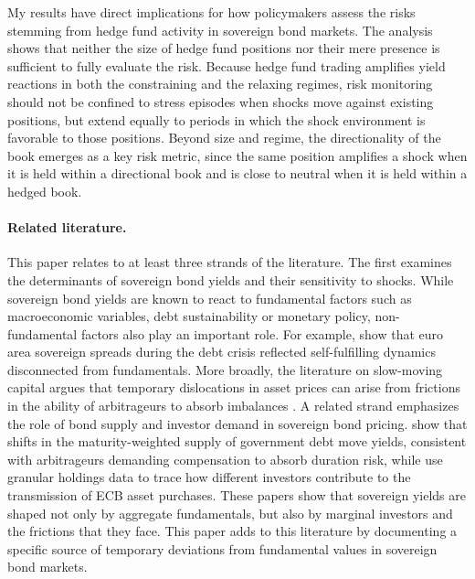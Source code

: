 \documentclass[english, 11pt, oneside]{article}
\begin{document}
My results have direct implications for how policymakers assess the risks stemming from hedge fund activity in sovereign bond markets. The analysis shows that neither the size of hedge fund positions nor their mere presence is sufficient to fully evaluate the risk. Because hedge fund trading amplifies yield reactions in both the constraining and the relaxing regimes, risk monitoring should not be confined to stress episodes when shocks move against existing positions, but extend equally to periods in which the shock environment is favorable to those positions. Beyond size and regime, the directionality of the book emerges as a key risk metric, since the same position amplifies a shock when it is held within a directional book and is close to neutral when it is held within a hedged book.


\paragraph{Related literature.} This paper relates to at least three strands of the literature. The first examines the determinants of sovereign bond yields and their sensitivity to shocks. While sovereign bond yields are known to react to fundamental factors such as macroeconomic variables, debt sustainability or monetary policy, non-fundamental factors also play an important role. For example, \citet{degauwe2013} show that euro area sovereign spreads during the debt crisis reflected self-fulfilling dynamics disconnected from fundamentals. More broadly, the literature on slow-moving capital argues that temporary dislocations in asset prices can arise from frictions in the ability of arbitrageurs to absorb imbalances \citep{duffie2010, mitchell2007}. A related strand emphasizes the role of bond supply and investor demand in sovereign bond pricing. \citet{greenwood2014} show that shifts in the maturity-weighted supply of government debt move yields, consistent with arbitrageurs demanding compensation to absorb duration risk, while \citet{koijen2021} use granular holdings data to trace how different investors contribute to the transmission of ECB asset purchases. These papers show that sovereign yields are shaped not only by aggregate fundamentals, but also by marginal investors and the frictions that they face. This paper adds to this literature by documenting a specific source of temporary deviations from fundamental values in sovereign bond markets.
\end{document}
